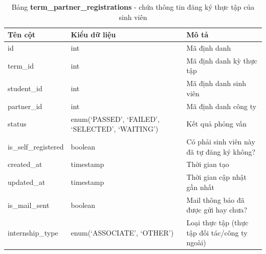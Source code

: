 \documentclass[./../main.tex]{subfiles}
\begin{document}
\begin{table}[H]
	\caption[Bảng term\_partner\_registrations]{Bảng \textbf{term\_partner\_registrations} - chứa thông tin đăng ký thực tập của sinh viên}
	\label{tab:db_term_partner_regs}
	\begin{tabularx}{\textwidth}{|l|X|X|}
		\hline
		\textbf{Tên cột}     & \textbf{Kiểu dữ liệu}                           & \textbf{Mô tả}                                 \\ \hline
		id                   & int                                             & Mã định danh                                   \\ \hline
		term\_id             & int                                             & Mã định danh kỳ thực tập                       \\ \hline
		student\_id          & int                                             & Mã định danh sinh viên                         \\ \hline
		partner\_id          & int                                             & Mã định danh công ty                           \\ \hline
		status               & enum(‘PASSED', ‘FAILED', ‘SELECTED', ‘WAITING') & Kết quả phỏng vấn                              \\ \hline
		is\_self\_registered & boolean                                         & Có phải sinh viên này đã tự đăng ký không?     \\ \hline
		created\_at          & timestamp                                       & Thời gian tạo                                  \\ \hline
		updated\_at          & timestamp                                       & Thời gian cập nhật gần nhất                    \\ \hline
		is\_mail\_sent       & boolean                                         & Mail thông báo đã được gửi hay chưa?           \\ \hline
		internship\_type     & enum(‘ASSOCIATE’, ‘OTHER')                      & Loại thực tập (thực tập đối tác/công ty ngoài) \\ \hline
	\end{tabularx}
\end{table}
\end{document}
